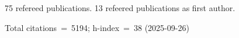 75 refereed publications. 13 refeered publications as first author.

Total citations~=~5194; h-index~=~38 (2025-09-26)